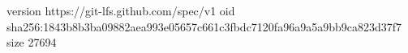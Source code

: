 version https://git-lfs.github.com/spec/v1
oid sha256:1843b8b3ba09882aea993e05657c661c3fbdc7120fa96a9a5a9bb9ca823d37f7
size 27694
